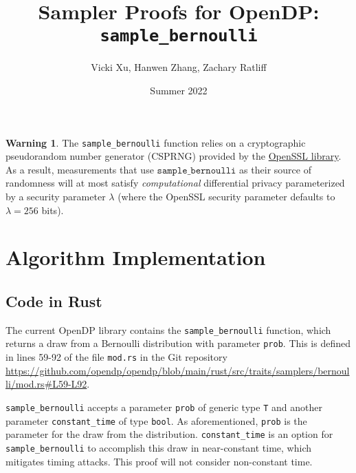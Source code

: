 \documentclass[11pt,a4paper]{article}
\title{Sampler Proofs for OpenDP: \texttt{sample\_bernoulli}}
\author{Vicki Xu, Hanwen Zhang, Zachary Ratliff}
\date{Summer 2022}
\theoremstyle{definition}
\newtheorem{warning}{Warning}
\begin{document}
\maketitle
\tableofcontents

\begin{tcolorbox}
\begin{warning}
The \texttt{sample\_bernoulli} function relies on a cryptographic pseudorandom number generator (CSPRNG) provided by the \href{https://www.openssl.org/docs/man1.1.1/man3/RAND_bytes.html}{OpenSSL library}. As a result, measurements that use $\texttt{sample\_bernoulli}$ as their source of randomness will at most satisfy \emph{computational} differential privacy parameterized by a security parameter $\lambda$ (where the OpenSSL security parameter defaults to $\lambda = 256$ bits). 
\end{warning}
\end{tcolorbox}


\section{Algorithm Implementation}
\subsection{Code in Rust}

The current OpenDP library contains the \texttt{sample\_bernoulli} function, which returns a draw from a Bernoulli distribution with parameter \texttt{prob}. This is defined in lines 59-92 of the file \texttt{mod.rs} in the Git repository \url{https://github.com/opendp/opendp/blob/main/rust/src/traits/samplers/bernoulli/mod.rs#L59-L92}. 

\texttt{sample\_bernoulli} accepts a parameter \texttt{prob} of generic type \texttt{T} and another parameter \texttt{constant\_time} of type \texttt{bool}. As aforementioned, \texttt{prob} is the parameter for the draw from the distribution. \texttt{constant\_time} is an option for \texttt{sample\_bernoulli} to accomplish this draw in near-constant time, which mitigates timing attacks. This proof will not consider non-constant time.
\end{document}
